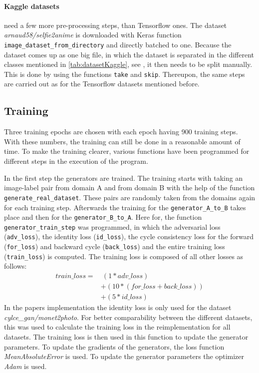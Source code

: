 \documentclass[fleqn,10pt]{SelfArx} %
\begin{document}
\paragraph{Kaggle datasets} need a few more pre-processing steps, than Tensorflow ones. The dataset \textit{arnaud58/selfie2anime} is downloaded with Keras function \texttt{image\_dataset\_from\-\_di\-rec\-tory} and directly batched to one. Because the dataset comes up as one big file, in which the dataset is separated in the different classes mentioned in \autoref{tab:datasetKaggle}, see \cite{kaggle-dataset}, it then needs to be split manually. This is done by using the functions \texttt{take} and \texttt{skip}. Thereupon, the same steps are carried out as for the Tensorflow datasets mentioned before.


\subsection{Training}
Three training epochs are chosen with each epoch having 900 training steps. With these numbers, the training can still be done in a reasonable amount of time. To make the training clearer, various functions have been programmed for different steps in the execution of the program.
 
In the first step the generators are trained. The training starts with taking an image-label pair from domain A and from domain B with the help of the function \texttt{generate\-\_real\-\_dataset}. These pairs are randomly taken from the domains again for each training step. Afterwards the training for the \texttt{generator\-\_A\-\_to\-\_B} takes place and then for the \texttt{generator\-\_B\-\_to\-\_A}. Here for, the function \texttt{generator\-\_train\-\_step} was programmed, in which the adversarial loss (\texttt{adv\-\_loss}), the identity loss (\texttt{id\-\_loss}), the cycle consistency loss for the forward (\texttt{for\_loss}) and backward cycle (\texttt{back\_loss}) and the entire training loss (\texttt{train\_loss}) is computed. The training loss is composed of all other losses as follows:
\begin{equation*}
\begin{split}
train\_loss = &~(1 * adv\_loss) \\
&+ (10 * (for\_loss + back\_loss)) \\
&+ (5 * id\_loss)
\end{split}
\end{equation*}
In the papers implementation the identity loss is only used for the dataset \textit{cylce\_gan/monet2photo}. For better comparability between the different datasets, this was used to calculate the training loss in the reimplementation for all datasets. The training loss is then used in this function to update the generator parameters. To update the gradients of the generators, the loss function \textit{MeanAbsoluteError} is used. To update the generator parameters the optimizer \textit{Adam} is used.~\cite{image-to-image-ccan, google-Adam, google-GradientTape}
\end{document}
